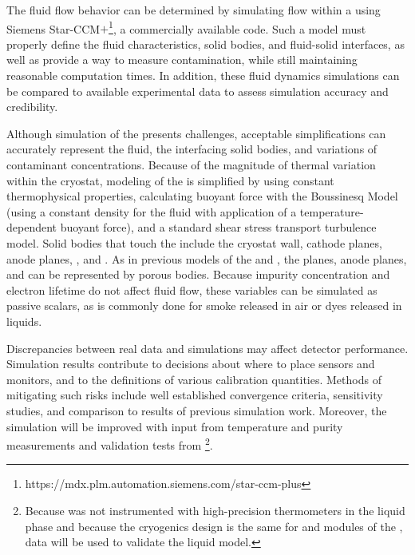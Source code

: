 The fluid flow behavior can be determined by simulating  flow within a  %
using Siemens Star-CCM$+$\footnote{https://mdx.plm.automation.siemens.com/star-ccm-plus}, a commercially available  code.  Such a model must properly define the fluid characteristics, solid bodies, and fluid-solid interfaces, as well as provide a way to measure contamination, while still maintaining reasonable computation times. In addition, these fluid dynamics simulations can be compared to available experimental data to assess simulation accuracy and credibility.



Although simulation of the  presents challenges, %
acceptable simplifications can %
accurately represent the fluid, the interfacing solid bodies, and variations of contaminant concentrations. Because of the magnitude of thermal variation within the cryostat, modeling of the  is simplified by using constant thermophysical properties, calculating buoyant force with the Boussinesq Model (using a constant density for the fluid with application of a temperature-dependent buoyant force), and a standard shear stress transport turbulence model. Solid bodies that touch the  include the cryostat wall, cathode planes, anode planes, , and . As in previous  models of the   and 
\cite{bib:docdb5915}, the  planes, anode planes, and  can be represented by porous bodies. Because impurity concentration and electron lifetime do not affect fluid flow, these variables can be simulated as passive scalars, as is commonly done for smoke released \cite{cfd-1} 
in air or dyes released in liquids.


Discrepancies between real data and simulations may affect detector performance. %
Simulation results contribute to decisions about where to place sensors and monitors, and to %
the definitions of various calibration quantities. Methods of mitigating such risks include well established convergence criteria, sensitivity studies, and comparison to results of previous  simulation work. Moreover, the simulation will be improved with input from \lar temperature and purity measurements and validation tests from \footnote{Because  was not instrumented with high-precision thermometers in the liquid phase and because the cryogenics design is the same for  and  modules of the  ,  data will be used to validate the liquid  model.}. 



